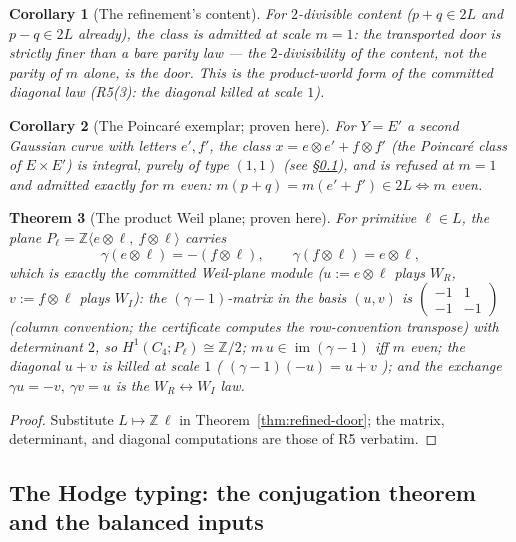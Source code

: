 \documentclass[11pt]{article}
\newcommand{\Img}{\operatorname{im}}
\newcommand{\Z}{\mathbb Z}
\newtheorem{theorem}{Theorem}[section]
\newtheorem{corollary}[theorem]{Corollary}
\begin{document}
\begin{corollary}[The refinement's content]
For $2$-divisible content ($p+q\in2L$ and $p-q\in2L$ already), the class
is admitted at scale $m=1$: the transported door is \emph{strictly finer}
than a bare parity law --- the $2$-divisibility of the content, not the
parity of $m$ alone, is the door. This is the product-world form of the
committed diagonal law (R5(3): the diagonal killed at scale $1$).
\end{corollary}

\begin{corollary}[The Poincaré exemplar; proven here]
For $Y=E'$ a second Gaussian curve with letters $e',f'$, the class
$x=e\otimes e'+f\otimes f'$ (the Poincaré class of $E\times E'$) is
integral, purely of type $(1,1)$ (see \S\ref{sec:hodge-typing}), and is
refused at $m=1$ and admitted exactly for $m$ even:
$m(p+q)=m(e'+f')\in2L\iff m$ even.
\end{corollary}

\begin{theorem}[The product Weil plane; proven here]\label{thm:product-plane}
For primitive $\ell\in L$, the plane
$P_\ell=\Z\langle e\otimes\ell,\ f\otimes\ell\rangle$ carries
\[
\gamma(e\otimes\ell)=-(f\otimes\ell),\qquad
\gamma(f\otimes\ell)=e\otimes\ell,
\]
which is \emph{exactly} the committed Weil-plane module
($u:=e\otimes\ell$ plays $W_R$, $v:=f\otimes\ell$ plays $W_I$): the
$(\gamma-1)$-matrix in the basis $(u,v)$ is
$\left(\begin{smallmatrix}-1&1\\-1&-1\end{smallmatrix}\right)$
(column convention; the certificate computes the row-convention transpose)
with determinant $2$, so $H^1(C_4;P_\ell)\cong\Z/2$; $m\,u\in\Img(\gamma-1)$ iff
$m$ even; the diagonal $u+v$ is killed at scale $1$
( $(\gamma-1)(-u)=u+v$ ); and the exchange
$\gamma u=-v,\ \gamma v=u$ is the $W_R\leftrightarrow W_I$ law.
\end{theorem}

\begin{proof}
Substitute $L\mapsto\Z\,\ell$ in Theorem~\ref{thm:refined-door}; the
matrix, determinant, and diagonal computations are those of R5 verbatim.
\end{proof}

\subsection{The Hodge typing: the conjugation theorem and the balanced
inputs}\label{sec:hodge-typing}
\end{document}
